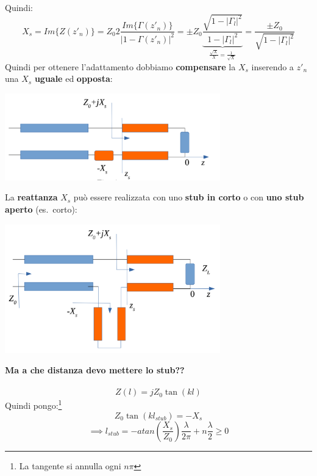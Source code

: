 Quindi:
\begin{equation*}
    X_s = Im\{Z(z'_n)\} = Z_0 2 \frac{Im\{\Gamma(z'_n)\}}{|1 - \Gamma(z'_n)|^2} =  \pm Z_0 \underbrace{\frac{\sqrt{1 - |\Gamma_l|^2}}{1 - |\Gamma_l|^2}}_{\frac{\sqrt{X}}{X} = \frac{1}{\sqrt{X}}} = \frac{\pm Z_0}{\sqrt{1 - |\Gamma_l|^2}}
\end{equation*}
Quindi per ottenere l'adattamento dobbiamo \textbf{compensare} la $X_s$ inserendo a $z'_n$ una $X_s$ \textbf{uguale} ed \textbf{opposta}:
\begin{center}
    \includegraphics[width=0.7\textwidth]{Images/figure23.png}
\end{center}
La \textbf{reattanza} $X_s$ può essere realizzata con uno \textbf{stub in corto} o con \textbf{uno stub aperto} (es.\ corto):
\begin{center}
    \includegraphics[width=0.7\textwidth]{Images/figure24.png}
\end{center}
\textbf{Ma a che distanza devo mettere lo stub??}\\ \\
\begin{equation*}
    Z(l) = j Z_0 \tan(kl)
\end{equation*}
Quindi pongo:\footnote{La tangente si annulla ogni $n\pi$}
\begin{equation*}
   Z_0 \tan(kl_{stub}) = - X_s
\end{equation*}
\begin{equation*}
  \implies l_{stub} = - atan\left(\frac{X_s}{Z_0}\right) \frac{\lambda}{2\pi} + n \frac{\lambda}{2} \geq 0
\end{equation*}
